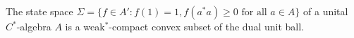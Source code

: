 The state space $\Sigma = \{f \in A' : f(1) = 1, f(a^*a) \geq 0 \text{ for all } a \in A\}$ of a unital $C^*$-algebra $A$ is a weak$^*$-compact convex subset of the dual unit ball.
